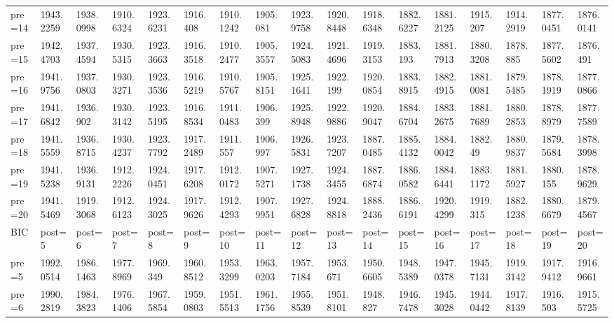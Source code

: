 \documentclass[11pt]{article}
\begin{document}
\begin{tabular}{lllllllllllllllll}
	 pre=14      & 1943.2259   & 1938.0998   & 1910.6324   & 1923.6231   & 1916.408    & 1910.1242   & 1905.081    & 1923.9758   & 1920.8448   & 1918.6348   & 1882.6227   & 1881.2125   & 1915.207    & 1914.2919   & 1877.0451   & 1876.0141  \\
	 pre=15      & 1942.4703   & 1937.4594   & 1930.5315   & 1923.3663   & 1916.3518   & 1910.2477   & 1905.3557   & 1924.5083   & 1921.4696   & 1919.3153   & 1883.193    & 1881.7913   & 1880.3208   & 1878.885    & 1877.5602   & 1876.491   \\
	 pre=16      & 1941.9756   & 1937.0803   & 1930.3271   & 1923.3536   & 1916.5219   & 1910.5767   & 1905.8151   & 1925.1641   & 1922.199    & 1920.0854   & 1883.8915   & 1882.4915   & 1881.0081   & 1879.5485   & 1878.1919   & 1877.0866  \\
	 pre=17      & 1941.6842   & 1936.902    & 1930.3142   & 1923.5195   & 1916.8534   & 1911.0483   & 1906.399    & 1925.8948   & 1922.9886   & 1920.9047   & 1884.6704   & 1883.2675   & 1881.7689   & 1880.2853   & 1878.8979   & 1877.7589  \\
	 pre=18      & 1941.5559   & 1936.8715   & 1930.4237   & 1923.7792   & 1917.2489   & 1911.557    & 1906.997    & 1926.5831   & 1923.7207   & 1887.0485   & 1885.4132   & 1884.0042   & 1882.49     & 1880.9837   & 1879.5684   & 1878.3998  \\
	 pre=19      & 1941.5238   & 1936.9131   & 1912.2226   & 1924.0451   & 1917.6208   & 1912.0172   & 1907.5271   & 1927.1738   & 1924.3455   & 1887.6874   & 1886.0582   & 1884.6441   & 1883.1172   & 1881.5927   & 1880.155    & 1878.9629  \\
	 pre=20      & 1941.5469   & 1919.3068   & 1912.6123   & 1924.3025   & 1917.9626   & 1912.4293   & 1907.9951   & 1927.6828   & 1924.8818   & 1888.2436   & 1886.6191   & 1920.4299   & 1919.315    & 1882.1238   & 1880.6679   & 1879.4567  \\
	 BIC         & post=5      & post=6      & post=7      & post=8      & post=9      & post=10     & post=11     & post=12     & post=13     & post=14     & post=15     & post=16     & post=17     & post=18     & post=19     & post=20    \\
	 pre=5       & 1992.0514   & 1986.1463   & 1977.8969   & 1969.349    & 1960.8512   & 1953.3299   & 1963.0203   & 1957.7184   & 1953.671    & 1950.6605   & 1948.5389   & 1947.0378   & 1945.7131   & 1919.3142   & 1917.9412   & 1916.9661  \\
	 pre=6       & 1990.2819   & 1984.3823   & 1976.1406   & 1967.5854   & 1959.0803   & 1951.5513   & 1961.1756   & 1955.8539   & 1951.8101   & 1948.827    & 1946.7478   & 1945.3028   & 1944.0442   & 1917.8139   & 1916.503    & 1915.5725  \\

\end{tabular}
\end{document}
